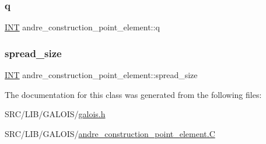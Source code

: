 \subsubsection{\texorpdfstring{q}{q}}
{\footnotesize\ttfamily \mbox{\hyperlink{galois_8h_a09fddde158a3a20bd2dcadb609de11dc}{I\+NT}} andre\+\_\+construction\+\_\+point\+\_\+element\+::q}

\mbox{\label{classandre__construction__point__element_ab22527f06d25f0d9d123f980b0b5cffa}} 
\subsubsection{\texorpdfstring{spread\+\_\+size}{spread\_size}}
{\footnotesize\ttfamily \mbox{\hyperlink{galois_8h_a09fddde158a3a20bd2dcadb609de11dc}{I\+NT}} andre\+\_\+construction\+\_\+point\+\_\+element\+::spread\+\_\+size}



The documentation for this class was generated from the following files\+:\begin{DoxyCompactItemize}
\item 
S\+R\+C/\+L\+I\+B/\+G\+A\+L\+O\+I\+S/\mbox{\hyperlink{galois_8h}{galois.\+h}}\item 
S\+R\+C/\+L\+I\+B/\+G\+A\+L\+O\+I\+S/\mbox{\hyperlink{andre__construction__point__element_8_c}{andre\+\_\+construction\+\_\+point\+\_\+element.\+C}}\end{DoxyCompactItemize}

